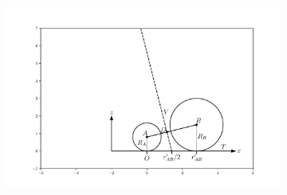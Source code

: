 \begin{figure}[tb]
	\centering
     
      \begin{subfigure}[b]{0.40\textwidth}
         \centering
         \includegraphics[width=\textwidth]{./figures/quasi2d/qtd_dia_a.pdf}
         \caption{}
         \label{fig:qtdda}
     \end{subfigure}
     \hfill
     

\end{figure}
